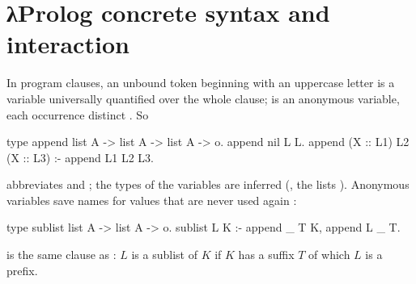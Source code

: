 \section{λProlog concrete syntax and interaction}\label{sec:horn-syntax}

In program clauses, an unbound token beginning with an uppercase letter is a variable universally
quantified over the whole clause; \lp{_} is an anonymous variable, each occurrence distinct .
So 
\begin{lprolog}
type append  list A -> list A -> list A -> o.
append nil L L.
append (X :: L1) L2 (X :: L3) :- append L1 L2 L3.
\end{lprolog}
abbreviates  and
; the types of the
variables are inferred (, the lists ). Anonymous variables save names for values
that are never used again :
\begin{lprolog}
type sublist  list A -> list A -> o.
sublist L K :- append _ T K, append L _ T.
\end{lprolog}
is the same clause as : $L$ is a sublist of $K$ if $K$
has a suffix $T$ of which $L$ is a prefix.


